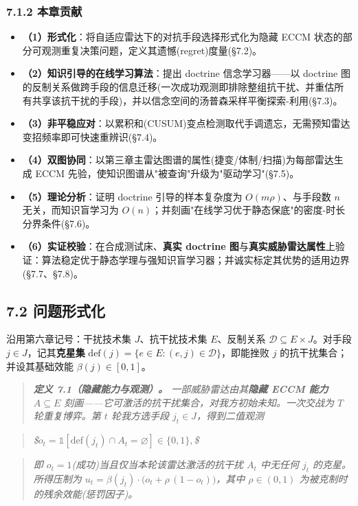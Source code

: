 \documentclass[12pt,a4paper]{ctexart}
\begin{document}
\subsubsection*{7.1.2 本章贡献}

\begin{itemize}[leftmargin=2em]
\item \textbf{（1）形式化}：将自适应雷达下的对抗手段选择形式化为隐藏 ECCM 状态的部分可观测重复决策问题，定义其遗憾(regret)度量(§7.2)。
\item \textbf{（2）知识引导的在线学习算法}：提出 doctrine 信念学习器——以 doctrine 图的反制关系做跨手段的信息迁移(一次成功观测即排除整组抗干扰、并重估所有共享该抗干扰的手段)，并以信念空间的汤普森采样平衡探索-利用(§7.3)。
\item \textbf{（3）非平稳应对}：以累积和(CUSUM)变点检测取代手调遗忘，无需预知雷达变招频率即可快速重辨识(§7.4)。
\item \textbf{（4）双图协同}：以第三章主雷达图谱的属性(捷变/体制/扫描)为每部雷达生成 ECCM 先验，使知识图谱从"被查询"升级为"驱动学习"(§7.5)。
\item \textbf{（5）理论分析}：证明 doctrine 引导的样本复杂度为 $O(m\rho)$、与手段数 $n$ 无关，而知识盲学习为 $O(n)$；并刻画"在线学习优于静态保底"的密度-时长分界条件(§7.6)。
\item \textbf{（6）实证校验}：在合成测试床、\textbf{真实 doctrine 图}与\textbf{真实威胁雷达属性}上验证：算法稳定优于静态学理与强知识盲学习器；并诚实标定其优势的适用边界(§7.7、§7.8)。
\end{itemize}


\subsection*{7.2 问题形式化}

沿用第六章记号：干扰技术集 $J$、抗干扰技术集 $E$、反制关系 $\mathcal{D}\subseteq E\times J$。对手段 $j\in J$，记其\textbf{克星集} $\mathrm{def}(j)=\{e\in E:(e,j)\in\mathcal{D}\}$，即能挫败 $j$ 的抗干扰集合；并设其基础效能 $\beta(j)\in[0,1]$。

\begin{quote}\itshape \textbf{定义 7.1（隐藏能力与观测）。} 一部威胁雷达由其\textbf{隐藏 ECCM 能力} $A\subseteq E$ 刻画——它\textit{可激活}的抗干扰集合，对我方初始未知。一次交战为 $T$ 轮重复博弈。第 $t$ 轮我方选手段 $j_t\in J$，得到二值观测\end{quote}
\begin{quote}\itshape \$$o_t=\mathbb{1}\!\left[\mathrm{def}(j_t)\cap A_t=\varnothing\right]\in\{0,1\},$\$\end{quote}
\begin{quote}\itshape 即 $o_t=1$(成功)当且仅当本轮该雷达激活的抗干扰 $A_t$ 中无任何 $j_t$ 的克星。所得压制为 $u_t=\beta(j_t)\cdot\big(o_t+\rho\,(1-o_t)\big)$，其中 $\rho\in(0,1)$ 为被克制时的残余效能(惩罚因子)。\end{quote}
\end{document}

